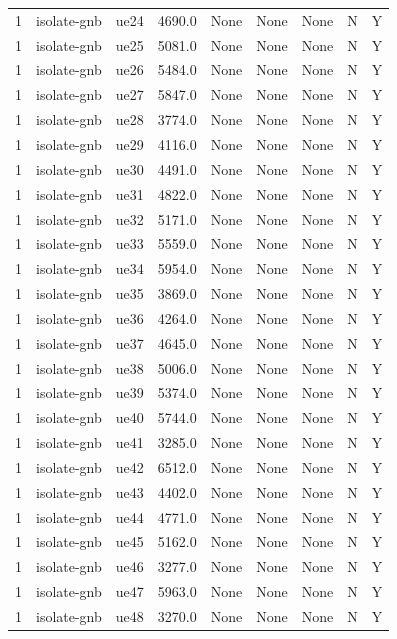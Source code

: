 \begin{table}[ht]
\begin{tabular}{|c|c|c|c|c|c|c|c|c|}
1 & isolate-gnb & ue24 & 4690.0 & None & None & None & N & Y \\
1 & isolate-gnb & ue25 & 5081.0 & None & None & None & N & Y \\
1 & isolate-gnb & ue26 & 5484.0 & None & None & None & N & Y \\
1 & isolate-gnb & ue27 & 5847.0 & None & None & None & N & Y \\
1 & isolate-gnb & ue28 & 3774.0 & None & None & None & N & Y \\
1 & isolate-gnb & ue29 & 4116.0 & None & None & None & N & Y \\
1 & isolate-gnb & ue30 & 4491.0 & None & None & None & N & Y \\
1 & isolate-gnb & ue31 & 4822.0 & None & None & None & N & Y \\
1 & isolate-gnb & ue32 & 5171.0 & None & None & None & N & Y \\
1 & isolate-gnb & ue33 & 5559.0 & None & None & None & N & Y \\
1 & isolate-gnb & ue34 & 5954.0 & None & None & None & N & Y \\
1 & isolate-gnb & ue35 & 3869.0 & None & None & None & N & Y \\
1 & isolate-gnb & ue36 & 4264.0 & None & None & None & N & Y \\
1 & isolate-gnb & ue37 & 4645.0 & None & None & None & N & Y \\
1 & isolate-gnb & ue38 & 5006.0 & None & None & None & N & Y \\
1 & isolate-gnb & ue39 & 5374.0 & None & None & None & N & Y \\
1 & isolate-gnb & ue40 & 5744.0 & None & None & None & N & Y \\
1 & isolate-gnb & ue41 & 3285.0 & None & None & None & N & Y \\
1 & isolate-gnb & ue42 & 6512.0 & None & None & None & N & Y \\
1 & isolate-gnb & ue43 & 4402.0 & None & None & None & N & Y \\
1 & isolate-gnb & ue44 & 4771.0 & None & None & None & N & Y \\
1 & isolate-gnb & ue45 & 5162.0 & None & None & None & N & Y \\
1 & isolate-gnb & ue46 & 3277.0 & None & None & None & N & Y \\
1 & isolate-gnb & ue47 & 5963.0 & None & None & None & N & Y \\
1 & isolate-gnb & ue48 & 3270.0 & None & None & None & N & Y \\

\end{tabular}
\end{table}

